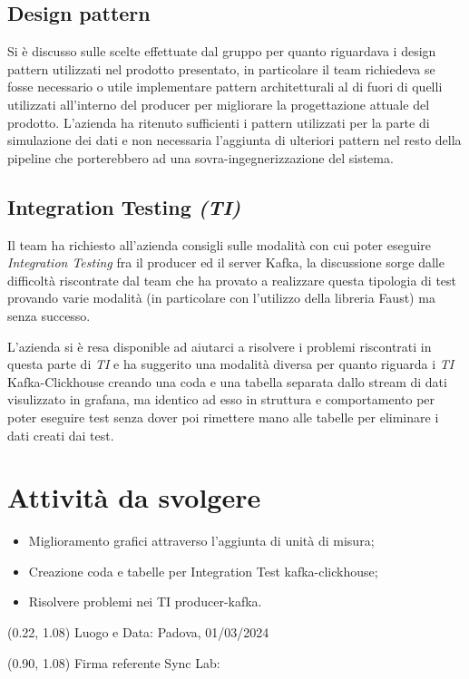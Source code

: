 \documentclass{article}
\begin{document}
    \subsection{Design pattern}
        Si è discusso sulle scelte effettuate dal gruppo per quanto riguardava i design pattern utilizzati nel prodotto presentato, in particolare il team richiedeva se fosse necessario o utile implementare pattern architetturali al di fuori di quelli utilizzati all'interno del producer per migliorare la progettazione attuale del prodotto. L'azienda ha ritenuto sufficienti i pattern utilizzati per la parte di simulazione dei dati e non necessaria l'aggiunta di ulteriori pattern nel resto della pipeline che porterebbero ad una sovra-ingegnerizzazione del sistema.  
    \subsection{Integration Testing \textit{(TI)}}
        Il team ha richiesto all'azienda consigli sulle modalità con cui poter eseguire \textit{Integration Testing} fra il producer ed il server Kafka, la discussione sorge dalle difficoltà riscontrate dal team che ha provato a realizzare questa tipologia di test provando varie modalità (in particolare con l'utilizzo della libreria Faust) ma senza successo.
        
        L'azienda si è resa disponible ad aiutarci a risolvere i problemi riscontrati in questa parte di \textit{TI} e ha suggerito una modalità diversa per quanto riguarda i \textit{TI} Kafka-Clickhouse creando una coda e una tabella separata dallo stream di dati visulizzato in grafana, ma identico ad esso in struttura e comportamento per poter eseguire test senza dover poi rimettere mano alle tabelle per eliminare i dati creati dai test.

\section{Attività da svolgere}
    \begin{itemize}
        \item Miglioramento grafici attraverso l'aggiunta di unità di misura;
        \item Creazione coda e tabelle per Integration Test kafka-clickhouse;
        \item Risolvere problemi nei TI producer-kafka.
    \end{itemize}

\begin{textblock*}{\textwidth}(0.22\textwidth, 1.08\textheight)
    Luogo e Data: Padova, 01/03/2024
\end{textblock*}

\begin{textblock*}{\textwidth}(0.90\textwidth, 1.08\textheight)
        Firma referente Sync Lab:
\end{textblock*}
\end{document}
